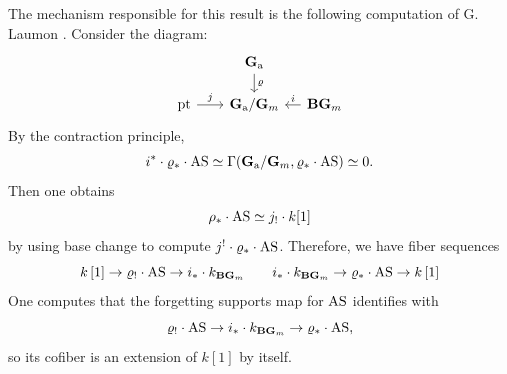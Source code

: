\subsubsection{} 
\label{subsubsection:laumon_calculation}
The mechanism responsible for this result is the following computation of G. Laumon \cite{laumon_fourier}. Consider the diagram:
\[
\begin{tikzcd}[
  column sep={5em,between origins},
  row sep={3em,between origins}
]
    & \Ga \arrow[d, "\varrho"] & \\
  \pt \arrow[r, "j"] & \Ga/\Gm & \arrow[l, "i" above] \BB\Gm
\end{tikzcd}
\]
By the contraction principle,
    \[i^* \cdot \varrho_* \cdot \mathrm{AS} \simeq \Gamma(\mathbf{G}_{\mathrm{a}}/\mathbf{G}_m, \varrho_* \cdot \mathrm{AS}) \simeq 0.\]
Then one obtains
    \[\rho_* \cdot \mathrm{AS} \simeq j_! \cdot k[1]\]
by using base change to compute $j^! \cdot \varrho_* \cdot \mathrm{AS}$. Therefore, we have fiber sequences
    \[
    k\,[1] \to \varrho_! \cdot \mathrm{AS} \to i_* \cdot k_{\mathbf{B}\mathbf{G}_m}
    \qquad
    i_* \cdot k_{\mathbf{B} \mathbf{G}_m} \to \varrho_* \cdot \mathrm{AS} \to k \, [1]
    \]
One computes that the forgetting supports map for $\mathrm{AS}$ identifies with
    \[\varrho_! \cdot \mathrm{AS} \to i_* \cdot k_{\mathbf{B}\mathbf{G}_m} \to \varrho_* \cdot \mathrm{AS},\]
so its cofiber is an extension of $k[1]$ by itself.

